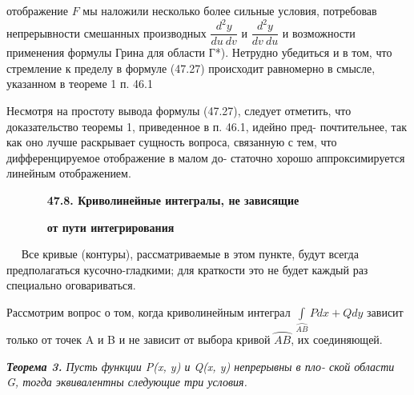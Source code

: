 \documentclass[10pt]{book}
\begin{document}
	
	\noindent отображение $F$ мы наложили несколько более сильные условия,\linebreak
	потребовав непрерывности смешанных производных $\dfrac{d^2y}{du \ dv}$ и $\dfrac{d^2y}{dv \ du}$ и\linebreak
	возможности применения формулы Грина для области {Г*}). Нетрудно \linebreak
	убедиться и в том, что стремление к пределу в формуле (47.27) \linebreak
	происходит равномерно в смысле, указанном в теореме 1 п. 46.1 \par
	
	Несмотря на простоту вывода формулы (47.27), следует отметить, \linebreak
		что доказательство теоремы 1, приведенное в п. 46.1, идейно пред- \linebreak
		почтительнее, так как оно лучше раскрывает сущность вопроса, \linebreak
		связанную с тем, что дифференцируемое отображение в малом до- \linebreak
		статочно хорошо аппроксимируется линейным отображением. \par
	\begin{flushleft}
		{\textbf{$ $ $ $ $ $ $ $ $ $ $ $ $ $ $ $ $ $ $ $\,47.8. Криволинейные интегралы, не зависящие} \par
		 \noindent\textbf{$ $ $ $ $ $ $ $ $ $ $ $ $ $ $ $ $ $ $ $\,от пути интегрирования}}
	\end{flushleft}	

	
	
	$ $ $ $ $ $\,\,\,\,Все кривые (контуры), рассматриваемые в этом пункте,\linebreak
	будут всегда предполагаться кусочно-гладкими; для краткости это\linebreak
	не будет каждый раз специально оговариваться.\par
	
	Рассмотрим вопрос о том, когда криволинейным интеграл \linebreak
	$\int\limits_{\wideparen{AB}} P dx + Q dy$ зависит только от точек A и B и не зависит от выбора \linebreak
	кривой $\wideparen{AB}$, их соединяющей. \par 
	
	\textit{\textbf{Теорема 3.} Пусть функции P(x, y) и Q(x, y) непрерывны в пло-\linebreak 
	ской области G, тогда эквивалентны следующие три условия.} \par
	
\end{document}
